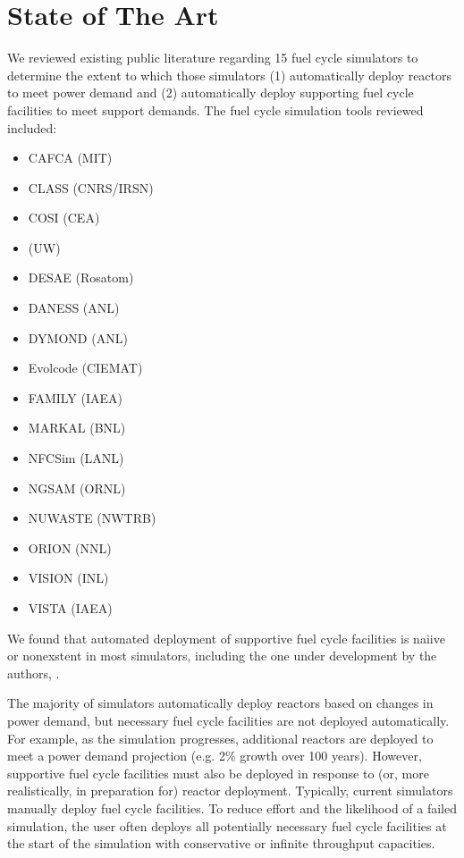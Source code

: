 \section{State of The Art}
We reviewed existing public literature regarding 15 fuel cycle simulators to 
determine the extent to which those simulators (1) automatically deploy reactors to 
meet power demand and (2) automatically deploy supporting fuel cycle facilities 
to meet support demands. The fuel cycle simulation tools reviewed included:
\begin{itemize}
        \item CAFCA (MIT) \cite{guerin_impact_2009} %
        \item CLASS (CNRS/IRSN) \cite{mouginot_class_2012} 
        \item COSI (CEA) \cite{coquelet-pascal_cosi6:_2015,boucher_international_2010}
        \item \Cyclus (UW) \cite{huff_fundamental_2016} %
        \item DESAE (Rosatom) \cite{boucher_international_2010}
        \item DANESS (ANL) \cite{van_den_durpel_daness:_2006} %
        \item DYMOND (ANL) \cite{park_modeling_2003}
        \item Evolcode (CIEMAT) \cite{boucher_international_2010}
        \item FAMILY (IAEA) \cite{boucher_international_2010}
        \item MARKAL (BNL) \cite{feng_standardized_2016}
        \item NFCSim (LANL) \cite{schneider_nfcsim:_2005}
        \item NGSAM (ORNL) \cite{aubin_development_2013}
        \item NUWASTE (NWTRB) \cite{garrick_nuclear_2011}
        \item ORION (NNL) \cite{feng_standardized_2016}
        \item VISION (INL) \cite{feng_standardized_2016,boucher_international_2010}
        \item VISTA (IAEA) \cite{iaea_nuclear_2007}
\end{itemize}

We found that automated deployment of supportive fuel cycle facilities is naiive or 
nonexstent in most simulators, including the one under development by the 
authors, \Cyclus.



The majority of simulators automatically deploy 
reactors based on changes in power demand, but necessary fuel cycle facilities 
are not deployed automatically.
For example, as the simulation 
progresses, additional reactors are deployed to meet a power demand projection 
(e.g. 2\% growth over 100 years). 
However, supportive fuel cycle facilities must also be deployed in response to 
(or, more realistically, in preparation for) reactor deployment.  
Typically, current simulators manually deploy fuel cycle 
facilities. To reduce effort and the likelihood of a failed simulation, the 
user often deploys all potentially necessary fuel cycle facilities at the start 
of the simulation with conservative or infinite throughput capacities. 

